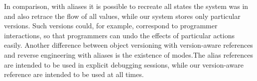 In comparison, with aliases it is possible to recreate all states the system was in and also retrace the flow of all values, while our system stores only particular versions.
Such versions could, for example, correspond to programmer interactions, so that programmers can undo the effects of particular actions easily.
Another difference between object versioning with version-aware references and reverse engineering with aliases is the existence of modes.The alias references are intended to be used in explicit debugging sessions, while our version-aware reference are intended to be used at all times.
